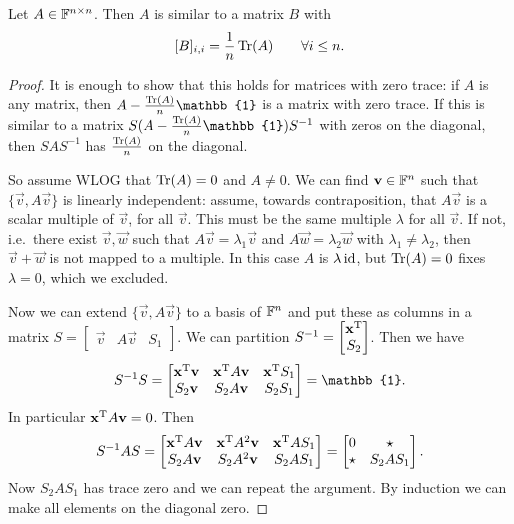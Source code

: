 \begin{lemma} \label{averageTraceOverDiagonal}
Let $A\in\mathbb{F}^{n\times n}$. Then $A$ is similar to a matrix $B$ with
\[ [B]_{i,i} = \frac{1}{n}\operatorname{Tr}(A) \qquad \forall i\leq n. \]
\end{lemma}
\begin{proof}
It is enough to show that this holds for matrices with zero trace: if $A$ is any matrix, then $A- \frac{\Tr(A)}{n}\mathbb{1}$ is a matrix with zero trace. If this is similar to a matrix $S(A- \frac{\Tr(A)}{n}\mathbb{1})S^{-1}$ with zeros on the diagonal, then $SAS^{-1}$ has $\frac{\operatorname{Tr}(A)}{n}$ on the diagonal.

So assume WLOG that $\operatorname{Tr}(A) = 0$ and $A\neq 0$. We can find $\boldsymbol{\mathrm{v}}\in\mathbb{F}^n$ such that $\{\vec{v}, A\vec{v}\}$ is linearly independent: assume, towards contraposition, that $A\vec{v}$ is a scalar multiple of $\vec{v}$, for all $\vec{v}$. This must be the same multiple $\lambda$ for all $\vec{v}$. If not, i.e.\ there exist $\vec{v},\vec{w}$ such that $A\vec{v} = \lambda_1 \vec{v}$ and $A\vec{w} = \lambda_2 \vec{w}$ with $\lambda_1\neq \lambda_2$, then $\vec{v}+\vec{w}$ is not mapped to a multiple. In this case $A$ is $\lambda \operatorname{id}$, but $\operatorname{Tr}(A) = 0$ fixes $\lambda=0$, which we excluded.

Now we can extend $\{\vec{v}, A\vec{v}\}$ to a basis of $\mathbb{F}^n$ and put these as columns in a matrix $S = \begin{bmatrix}
\vec{v} & A\vec{v} & S_1
\end{bmatrix}$. We can partition $S^{-1} = \begin{bmatrix}
\boldsymbol{\mathrm{x}}^{\mathrm{T}} \\ S_2
\end{bmatrix}$. Then we have
\[ S^{-1}S = \begin{bmatrix}
\vec{x}^\transp \vec{v} & \vec{x}^\transp A\vec{v} & \vec{x}^\transp S_1 \\ S_2\vec{v} & S_2A\vec{v} & S_2S_1
\end{bmatrix} = \mathbb{1}. \]
In particular $\boldsymbol{\mathrm{x}}^{\mathrm{T}} A\boldsymbol{\mathrm{v}} = 0$. Then
\[ S^{-1}AS = \begin{bmatrix}
\boldsymbol{\mathrm{x}}^{\mathrm{T}} A\boldsymbol{\mathrm{v}} & \boldsymbol{\mathrm{x}}^{\mathrm{T}} A^2\boldsymbol{\mathrm{v}} & \boldsymbol{\mathrm{x}}^{\mathrm{T}} A S_1 \\
S_2A\boldsymbol{\mathrm{v}} & S_2A^2\boldsymbol{\mathrm{v}} & S_2AS_1
\end{bmatrix}  = \begin{bmatrix}
0 & \star \\ \star & S_2AS_1
\end{bmatrix}. \]
Now $S_2AS_1$ has trace zero and we can repeat the argument. By induction we can make all elements on the diagonal zero.
\end{proof}



